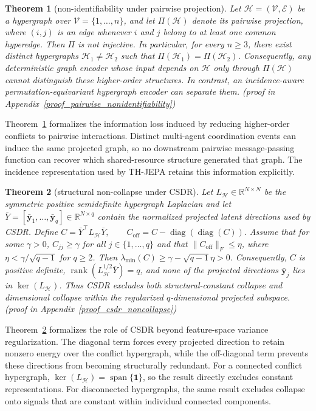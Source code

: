 \documentclass{article} %
\newtheorem{theorem}{Theorem}
\begin{document}
\begin{theorem}[non-identifiability under pairwise projection] \label{thm:pairwise_nonidentifiability} Let $\mathcal{H}=(\mathcal{V},\mathcal{E})$ be a hypergraph over $\mathcal{V}=\{1,\ldots,n\}$, and let $\Pi(\mathcal{H})$ denote its pairwise projection, where $(i,j)$ is an edge whenever $i$ and $j$ belong to at least one common hyperedge. Then $\Pi$ is not injective. In particular, for every $n\geq 3$, there exist distinct hypergraphs $\mathcal{H}_1\neq\mathcal{H}_2$ such that $\Pi(\mathcal{H}_1)=\Pi(\mathcal{H}_2)$. Consequently, any deterministic graph encoder whose input depends on $\mathcal{H}$ only through $\Pi(\mathcal{H})$ cannot distinguish these higher-order structures. In contrast, an incidence-aware permutation-equivariant hypergraph encoder can separate them. (proof in Appendix~\ref{proof_pairwise_nonidentifiability}) \end{theorem}
Theorem~\ref{thm:pairwise_nonidentifiability} formalizes the information loss induced by reducing higher-order conflicts to pairwise interactions. Distinct multi-agent coordination events can induce the same projected graph, so no downstream pairwise message-passing function can recover which shared-resource structure generated that graph. The incidence representation used by TH-JEPA retains this information explicitly.

\begin{theorem}[structural non-collapse under CSDR] \label{thm:csdr_noncollapse} Let $L_{\mathcal{H}}\in\mathbb{R}^{N\times N}$ be the symmetric positive semidefinite hypergraph Laplacian and let $\bar{Y}=[\bar{\mathbf{y}}_1,\ldots,\bar{\mathbf{y}}_q]\in\mathbb{R}^{N\times q}$ contain the normalized projected latent directions used by CSDR. Define $ C = \bar{Y}^{\top}L_{\mathcal{H}}\bar{Y}, \qquad C_{\mathrm{off}} = C-\operatorname{diag}(\operatorname{diag}(C)). $ Assume that for some $\gamma>0$, $C_{jj}\geq\gamma$ for all $j\in\{1,\ldots,q\}$ and that $\|C_{\mathrm{off}}\|_F\leq\eta$, where $\eta<\gamma/\sqrt{q-1}$ for $q\geq2$. Then $ \lambda_{\min}(C) \geq \gamma-\sqrt{q-1}\eta > 0. $ Consequently, $C$ is positive definite, $\operatorname{rank}(L_{\mathcal{H}}^{1/2}\bar{Y})=q$, and none of the projected directions $\bar{\mathbf{y}}_j$ lies in $\ker(L_{\mathcal{H}})$. Thus CSDR excludes both structural-constant collapse and dimensional collapse within the regularized $q$-dimensional projected subspace. (proof in Appendix~\ref{proof_csdr_noncollapse}) \end{theorem} Theorem~\ref{thm:csdr_noncollapse} formalizes the role of CSDR beyond feature-space variance regularization. The diagonal term forces every projected direction to retain nonzero energy over the conflict hypergraph, while the off-diagonal term prevents these directions from becoming structurally redundant. For a connected conflict hypergraph, $\ker(L_{\mathcal{H}})=\operatorname{span}\{\mathbf{1}\}$, so the result directly excludes constant representations. For disconnected hypergraphs, the same result excludes collapse onto signals that are constant within individual connected components.
\end{document}
